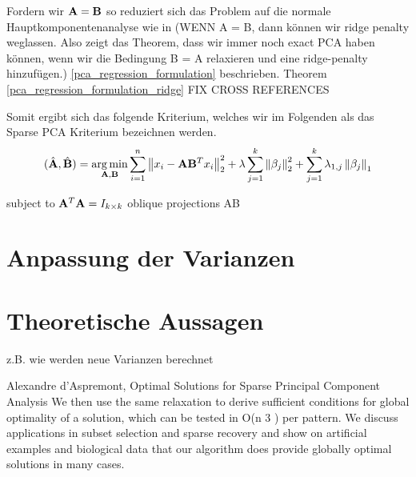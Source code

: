 Fordern wir $\mathbf{A} =  \mathbf{B}$ so reduziert sich das Problem auf die normale Hauptkomponentenanalyse wie in (WENN A = B, dann können wir ridge penalty weglassen. Also zeigt das Theorem, dass wir immer noch exact PCA haben können, wenn wir die Bedingung B = A relaxieren und eine ridge-penalty hinzufügen.) \ref{pca_regression_formulation} beschrieben.
Theorem \ref{pca_regression_formulation_ridge} FIX CROSS REFERENCES

Somit ergibt sich das folgende Kriterium, welches wir im Folgenden als das Sparse PCA Kriterium bezeichnen werden.
$$(\hat{\mathbf{A}}, \hat{\mathbf{B}}) = \operatorname*{arg\,min}_{\mathbf{A}, \mathbf{B}} \sum_{i=1}^{n} \left\lVert x_i - \mathbf{A}\mathbf{B}^Tx_i \right\rVert_2^2 + \lambda \sum_{j=1}^{k}\left\lVert \beta_j \right\rVert_2^2 + \sum_{j=1}^k \lambda_{1,j} \left\lVert \beta_j \right\rVert_1$$

subject to $\mathbf{A}^T\mathbf{A} = I_{k \times k}$
oblique projections AB

\section{Anpassung der Varianzen}

\section{Theoretische Aussagen} 
\label{spca_theorems}
z.B. wie werden neue Varianzen berechnet

Alexandre d’Aspremont, Optimal Solutions for Sparse Principal Component Analysis
We then use the same relaxation to derive sufficient conditions for global optimality of a
solution, which can be tested in O(n
3
) per pattern. We discuss applications in subset selection and
sparse recovery and show on artificial examples and biological data that our algorithm does provide
globally optimal solutions in many cases.